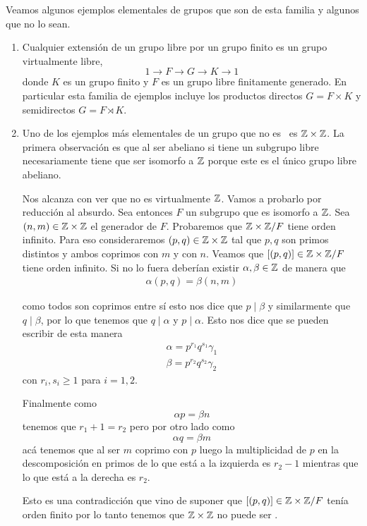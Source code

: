 \documentclass[tesis.tex]{subfiles}
\begin{document}
\begin{ej}
	Veamos algunos ejemplos elementales de grupos que son de esta familia y algunos que no lo sean.
	
	\begin{enumerate}	
		\item 
		Cualquier extensión de un grupo libre por un grupo finito es un grupo virtualmente libre,
		\[
		1 \to F \to G \to K \to 1
		\]
		donde $K$ es un grupo finito y $F$ es un grupo libre finitamente generado.
		En particular esta familia de ejemplos incluye los productos directos $G= F \times K$ y semidirectos $G = F \rtimes K$.
		
		
		\item Uno de los ejemplos más elementales de un grupo que no es \vl \ es $\mathbb{Z} \times \mathbb{Z}$.
		La primera observación es que al ser abeliano si tiene un subgrupo libre necesariamente tiene que ser isomorfo a $\mathbb{Z}$ porque este es el único grupo libre abeliano.
		
		Nos alcanza con ver que no es virtualmente $\mathbb{Z}$.
		Vamos a probarlo por reducción al absurdo. 
		Sea entonces $F$ un subgrupo que es isomorfo a $\mathbb{Z}$.
		Sea $(n,m) \in \mathbb{Z} \times \mathbb{Z}$ el generador de $F$.
		Probaremos que $\mathbb{Z} \times \mathbb{Z} / F$ tiene orden infinito.
		Para eso consideraremos $(p,q) \in \mathbb{Z} \times \mathbb{Z}$	tal que $p,q$ son primos distintos y ambos coprimos con $m$ y con $n$.
		Veamos que $[(p,q)] \in \mathbb{Z} \times \mathbb{Z} / F$ tiene orden infinito.
		Si no lo fuera deberían existir $\alpha, \beta \in \mathbb{Z}$ de manera que 
		\begin{align*}
			\alpha (p,q) = \beta(n,m) 
		\end{align*}
		
		como todos son coprimos entre sí esto nos dice que $p \mid \beta$ y similarmente que $q \mid \beta$, por lo que tenemos que $q \mid \alpha$ y $p \mid \alpha$.
		Esto nos dice que se pueden escribir de esta manera
		\begin{align*}
			\alpha = p^{r_1} q^{s_1} \gamma_1 \\
			\beta = p^{r_2} q^{s_2} \gamma_2
		\end{align*}
		con $r_i, s_i \ge 1$ para $i=1,2$.
		
		Finalmente como 
		\[ 
		\alpha p = \beta n
		\]
		tenemos que $r_1+ 1 = r_2$ pero por otro lado como
		\[
		\alpha q  = \beta m
		\]
		acá tenemos que al ser $m$ coprimo con $p$ luego la multiplicidad de $p$ en la descomposición en primos de lo que está a la izquierda es $r_2 - 1 $ mientras que lo que está a la derecha es $r_2$.
		
		Esto es una contradicción que vino de suponer que $[(p,q)] \in \mathbb{Z} \times \mathbb{Z} / F$ tenía orden finito por lo tanto tenemos que $\mathbb{Z} \times \mathbb{Z}$ no puede ser \vl.
		
	\end{enumerate}
\end{ej}
\end{document}
